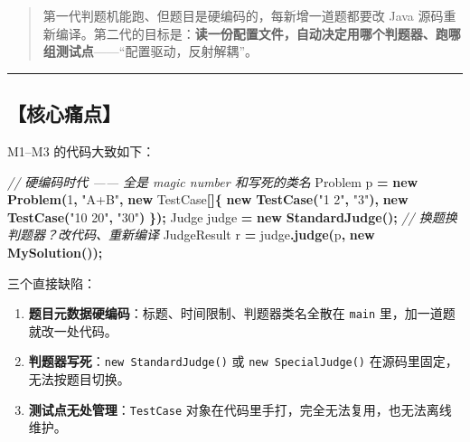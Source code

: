 \documentclass[
  11pt,
]{ctexart}
\newenvironment{Shaded}{\begin{snugshade}}{\end{snugshade}}
\newcommand{\CommentTok}[1]{\textcolor[rgb]{0.56,0.35,0.01}{\textit{#1}}}
\newcommand{\DecValTok}[1]{\textcolor[rgb]{0.00,0.00,0.81}{#1}}
\newcommand{\FunctionTok}[1]{\textcolor[rgb]{0.13,0.29,0.53}{\textbf{#1}}}
\newcommand{\KeywordTok}[1]{\textcolor[rgb]{0.13,0.29,0.53}{\textbf{#1}}}
\newcommand{\NormalTok}[1]{#1}
\newcommand{\OperatorTok}[1]{\textcolor[rgb]{0.81,0.36,0.00}{\textbf{#1}}}
\newcommand{\StringTok}[1]{\textcolor[rgb]{0.31,0.60,0.02}{#1}}
\providecommand{\tightlist}{%
  \setlength{\itemsep}{0pt}\setlength{\parskip}{0pt}}
\begin{document}
\begin{quote}
第一代判题机能跑、但题目是硬编码的，每新增一道题都要改 Java
源码重新编译。第二代的目标是：\textbf{读一份配置文件，自动决定用哪个判题器、跑哪组测试点}------``配置驱动，反射解耦''。
\end{quote}

\begin{center}\rule{0.5\linewidth}{0.5pt}\end{center}

\hypertarget{ux6838ux5fc3ux75dbux70b9}{%
\subsection{【核心痛点】}\label{ux6838ux5fc3ux75dbux70b9}}

M1--M3 的代码大致如下：

\begin{Shaded}
\begin{Highlighting}[]
\CommentTok{// 硬编码时代 —— 全是 magic number 和写死的类名}
\NormalTok{Problem p }\OperatorTok{=} \KeywordTok{new} \FunctionTok{Problem}\OperatorTok{(}\DecValTok{1}\OperatorTok{,} \StringTok{"A+B"}\OperatorTok{,} \KeywordTok{new}\NormalTok{ TestCase}\OperatorTok{[]\{}
    \KeywordTok{new} \FunctionTok{TestCase}\OperatorTok{(}\StringTok{"1 2"}\OperatorTok{,} \StringTok{"3"}\OperatorTok{),}
    \KeywordTok{new} \FunctionTok{TestCase}\OperatorTok{(}\StringTok{"10 20"}\OperatorTok{,} \StringTok{"30"}\OperatorTok{)}
\OperatorTok{\});}
\NormalTok{Judge judge }\OperatorTok{=} \KeywordTok{new} \FunctionTok{StandardJudge}\OperatorTok{();}   \CommentTok{// 换题换判题器？改代码、重新编译}
\NormalTok{JudgeResult r }\OperatorTok{=}\NormalTok{ judge}\OperatorTok{.}\FunctionTok{judge}\OperatorTok{(}\NormalTok{p}\OperatorTok{,} \KeywordTok{new} \FunctionTok{MySolution}\OperatorTok{());}
\end{Highlighting}
\end{Shaded}

三个直接缺陷：

\begin{enumerate}
\def\labelenumi{\arabic{enumi}.}
\tightlist
\item
  \textbf{题目元数据硬编码}：标题、时间限制、判题器类名全散在
  \texttt{main} 里，加一道题就改一处代码。
\item
  \textbf{判题器写死}：\texttt{new\ StandardJudge()} 或
  \texttt{new\ SpecialJudge()} 在源码里固定，无法按题目切换。
\item
  \textbf{测试点无处管理}：\texttt{TestCase}
  对象在代码里手打，完全无法复用，也无法离线维护。
\end{enumerate}
\end{document}
